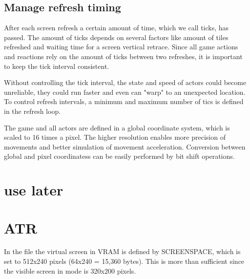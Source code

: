 \documentclass[book.tex]{subfiles}
\begin{document}
\subsection{Manage refresh timing}
After each screen refresh a certain amount of time, which we call ticks, has passed. The amount of ticks depends on several factors like amount of tiles refreshed and waiting time for a screen vertical retrace. Since all game actions and reactions rely on the amount of ticks between two refreshes, it is important to keep the tick interval consistent.\\

\par
Without controlling the tick interval, the state and speed of actors could become unreliable, they could run faster and even can "warp" to an unexpected location. To control refresh intervals, a minimum and maximum number of tics is defined in the refresh loop.\\

\par
\begin{minipage}{\textwidth}
  
\end{minipage}
\label{time_ticks}
\par

\pagebreak

The game and all actors are defined in a global coordinate system, which is scaled to 16 times a pixel. The higher resolution enables more precision of movements and better simulation of movement acceleration. Conversion between global and pixel coordinatess can be easily performed by bit shift operations.\\
\section{use later}
\begin{minipage}{\textwidth}
  
  \end{minipage}
  \label{ega_refresh}
  \par

\section{ATR}


In the file  the virtual screen in VRAM is defined by SCREENSPACE, which is set to 512x240 pixels (64x240 = 15,360 bytes). This is more than sufficient since the visible screen in mode  is 320x200 pixels.\\
\end{document}
